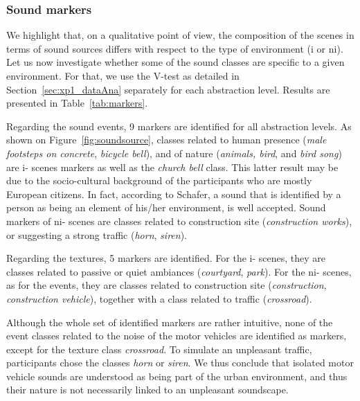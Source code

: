 \documentclass[twoside,twocolumn]{article}
\begin{document}
\subsubsection*{Sound markers}

We highlight that, on a qualitative point of view, the composition of the scenes in terms of sound sources differs with respect to the type of environment (i or ni). Let us now investigate whether some of the sound classes are specific to a given environment. For that, we use the V-test as detailed in  Section~\ref{sec:xp1_dataAna} separately for each abstraction level. Results are presented in Table~\ref{tab:markers}.

Regarding the sound events, 9 markers are identified for all abstraction levels. As shown on Figure~\ref{fig:soundsource}, classes related to human presence (\emph{male footsteps on concrete}, \emph{bicycle bell}), and of nature (\emph{animals, bird}, and \emph{bird song}) are i- scenes markers as well as the \emph{church bell} class. This latter result may be due to the socio-cultural background of the participants who are mostly European citizens. In fact, according to Schafer, a sound that is identified by a person as being an element of his/her environment, is well accepted. Sound markers of ni- scenes are classes related to construction site (\emph{construction works}), or suggesting a strong traffic (\emph{horn}, \emph{siren}).

Regarding the textures, 5 markers are identified. For the i- scenes, they are classes related to passive or quiet ambiances (\emph{courtyard}, \emph{park}). For the ni- scenes, as for the events, they are classes related to construction site (\emph{construction}, \emph{construction vehicle}), together with a class related to traffic (\emph{crossroad}).

Although the whole set of identified markers are rather intuitive, none of the event classes related to the noise of the motor vehicles are identified as markers, except for the texture class \emph{crossroad}. To simulate an unpleasant traffic, participants chose the classes \emph{horn} or \emph{siren}. We thus conclude that isolated motor vehicle sounds are understood as being part of the urban environment, and thus their nature is not necessarily linked to an unpleasant soundscape.
\end{document}
